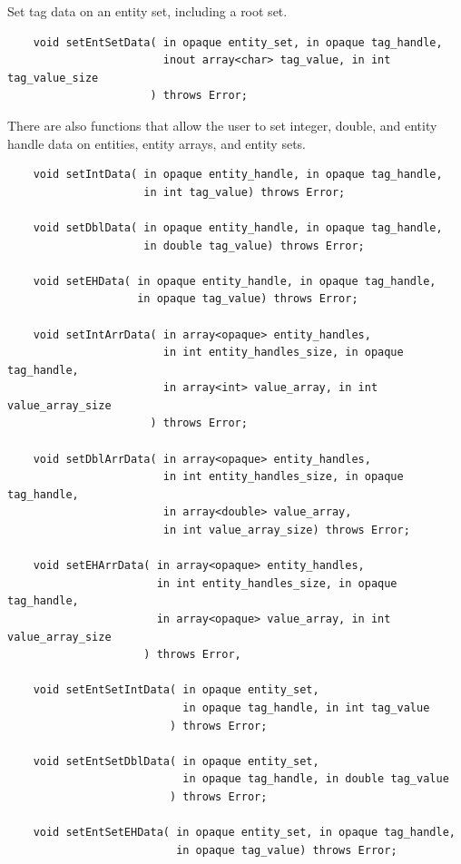 \documentclass{article}
\begin{document}
Set tag data on an entity set, including a root set.

\begin{verbatim} 
    void setEntSetData( in opaque entity_set, in opaque tag_handle, 
                        inout array<char> tag_value, in int tag_value_size
                      ) throws Error; 
\end{verbatim}

There are also functions that allow the user to set integer, 
double, and entity handle data on entities, entity arrays, and 
entity sets. 
\begin{verbatim}
    void setIntData( in opaque entity_handle, in opaque tag_handle, 
                     in int tag_value) throws Error; 

    void setDblData( in opaque entity_handle, in opaque tag_handle, 
                     in double tag_value) throws Error; 

    void setEHData( in opaque entity_handle, in opaque tag_handle,
                    in opaque tag_value) throws Error;

    void setIntArrData( in array<opaque> entity_handles, 
                        in int entity_handles_size, in opaque tag_handle,  
                        in array<int> value_array, in int value_array_size
                      ) throws Error;

    void setDblArrData( in array<opaque> entity_handles, 
                        in int entity_handles_size, in opaque tag_handle,   
                        in array<double> value_array,  
                        in int value_array_size) throws Error;
    
    void setEHArrData( in array<opaque> entity_handles,
                       in int entity_handles_size, in opaque tag_handle,
                       in array<opaque> value_array, in int value_array_size
                     ) throws Error,

    void setEntSetIntData( in opaque entity_set, 
                           in opaque tag_handle, in int tag_value
                         ) throws Error;
    
    void setEntSetDblData( in opaque entity_set, 
                           in opaque tag_handle, in double tag_value
                         ) throws Error;

    void setEntSetEHData( in opaque entity_set, in opaque tag_handle,
                          in opaque tag_value) throws Error;
\end{verbatim}
\end{document}

